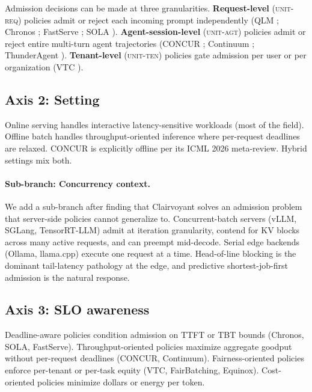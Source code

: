 \documentclass[11pt,letterpaper]{article}
\theoremstyle{definition}
\begin{document}
Admission decisions can be made at three granularities.
\textbf{Request-level} (\textsc{unit-req}) policies admit or reject
each incoming prompt independently (QLM \cite{patke2024qlm}; Chronos
\cite{marref2026chronos}; FastServe \cite{wu2026fastserve}; SOLA
\cite{hong2025sola}). \textbf{Agent-session-level} (\textsc{unit-agt})
policies admit or reject entire multi-turn agent trajectories (CONCUR
\cite{chen2026concur}; Continuum \cite{li2026continuum}; ThunderAgent
\cite{kang2026thunderagent}). \textbf{Tenant-level} (\textsc{unit-ten})
policies gate admission per user or per organization (VTC
\cite{sheng2024vtc}).

\subsection{Axis 2: Setting}

Online serving handles interactive latency-sensitive workloads (most
of the field). Offline batch handles throughput-oriented inference
where per-request deadlines are relaxed. CONCUR is explicitly offline
per its ICML 2026 meta-review. Hybrid settings mix both.

\paragraph{Sub-branch: Concurrency context.}
We add a sub-branch after finding that Clairvoyant
\cite{sundaresan2026clairvoyant} solves an admission problem that
server-side policies cannot generalize to. Concurrent-batch servers
(vLLM, SGLang, TensorRT-LLM) admit at iteration granularity, contend
for KV blocks across many active requests, and can preempt mid-decode.
Serial edge backends (Ollama, llama.cpp) execute one request at a
time. Head-of-line blocking is the dominant tail-latency pathology at
the edge, and predictive shortest-job-first admission is the natural
response.

\subsection{Axis 3: SLO awareness}

Deadline-aware policies condition admission on TTFT or TBT bounds
(Chronos, SOLA, FastServe). Throughput-oriented policies maximize
aggregate goodput without per-request deadlines (CONCUR, Continuum).
Fairness-oriented policies enforce per-tenant or per-task equity (VTC,
FairBatching, Equinox). Cost-oriented policies minimize dollars or
energy per token.
\end{document}
